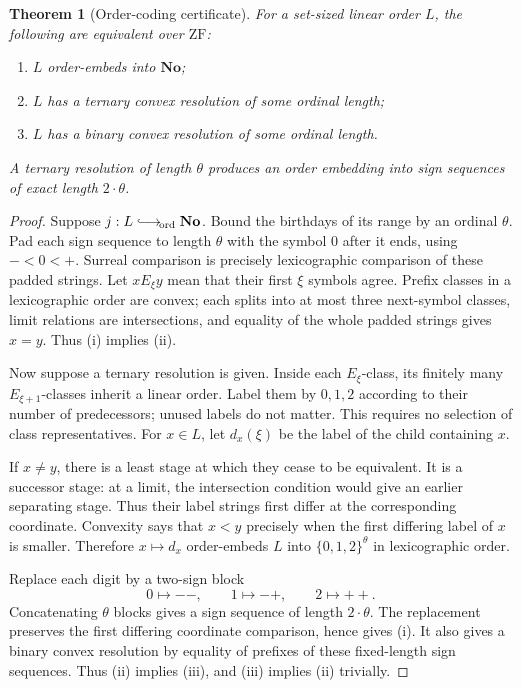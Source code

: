 \documentclass[11pt,letterpaper]{article}
\newtheorem{theorem}{Theorem}[section]
\theoremstyle{definition}
\theoremstyle{remark}
\newcommand{\No}{\mathbf{No}}
\newcommand{\ZF}{\mathrm{ZF}}
\newcommand{\hookord}{\mathrel{\lhook\joinrel\longrightarrow_{\!\mathrm{ord}}}}
\begin{document}
\begin{theorem}[Order-coding certificate]\label{hset:kw:thm:resolution}
For a set-sized linear order $L$, the following are equivalent over $\ZF$:
\begin{enumerate}[label=(\roman*)]
\item $L$ order-embeds into $\No$;
\item $L$ has a ternary convex resolution of some ordinal length;
\item $L$ has a binary convex resolution of some ordinal length.
\end{enumerate}
A ternary resolution of length $\theta$ produces an order embedding into sign sequences of exact length $2\cdot\theta$.
\end{theorem}
\begin{proof}
Suppose $j:L\hookord\No$. Bound the birthdays of its range by an ordinal $\theta$. Pad each sign sequence to length $\theta$ with the symbol $0$ after it ends, using $-<0<+$. Surreal comparison is precisely lexicographic comparison of these padded strings. Let $xE_\xi y$ mean that their first $\xi$ symbols agree. Prefix classes in a lexicographic order are convex; each splits into at most three next-symbol classes, limit relations are intersections, and equality of the whole padded strings gives $x=y$. Thus (i) implies (ii).

Now suppose a ternary resolution is given. Inside each $E_\xi$-class, its finitely many $E_{\xi+1}$-classes inherit a linear order. Label them by $0,1,2$ according to their number of predecessors; unused labels do not matter. This requires no selection of class representatives. For $x\in L$, let $d_x(\xi)$ be the label of the child containing $x$.

If $x\ne y$, there is a least stage at which they cease to be equivalent. It is a successor stage: at a limit, the intersection condition would give an earlier separating stage. Thus their label strings first differ at the corresponding coordinate. Convexity says that $x<y$ precisely when the first differing label of $x$ is smaller. Therefore $x\mapsto d_x$ order-embeds $L$ into $\{0,1,2\}^{\theta}$ in lexicographic order.

Replace each digit by a two-sign block
\[
0\mapsto --,\qquad 1\mapsto -+,\qquad 2\mapsto ++.
\]
Concatenating $\theta$ blocks gives a sign sequence of length $2\cdot\theta$. The replacement preserves the first differing coordinate comparison, hence gives (i). It also gives a binary convex resolution by equality of prefixes of these fixed-length sign sequences. Thus (ii) implies (iii), and (iii) implies (ii) trivially.
\end{proof}
\end{document}
